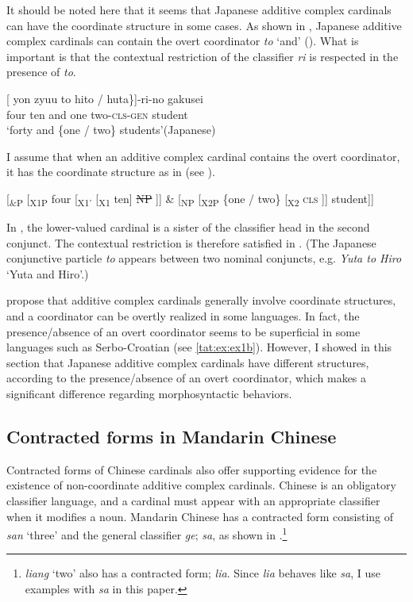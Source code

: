 \documentclass[output=paper]{langscibook}
\begin{document}
It should be noted here that it seems that Japanese additive complex cardinals can have the coordinate structure in some cases. As shown in , Japanese additive complex cardinals can contain the overt coordinator \textit{to} `and' (\citet{Hiraiwa2016ms}). What is important is that the contextual restriction of the classifier \textit{ri} is respected in the presence of \textit{to}. 

\ea\label{tat:ex:jap.additive.and}
\gll \textnormal{[} yon zyuu to \minsp{\{} hito / huta\textnormal{\}]}-ri-no gakusei\\  
      {} four ten and {} one {} two-\textsc{cls-gen} student\\ 
\glt `forty and \{one / two\} students'\hfill(Japanese)
\z

\noindent I assume that when an additive complex cardinal contains the overt coordinator, it has the coordinate structure as in  (see ).

\ea\label{tat:ex:jap.coord.st} 
{[}\textsubscript{\&P} [\textsubscript{X1P} four [\textsubscript{X1'} [\textsubscript{X1} ten] \sout{NP} ]] \& [\textsubscript{NP} [\textsubscript{X2P} \{one / two\} [\textsubscript{X2} \textsc{cls} ]] student]]
\z

\noindent In , the lower-valued cardinal is a sister of the classifier head in the second conjunct. The contextual restriction is therefore satisfied in . (The Japanese conjunctive particle \textit{to} appears between two nominal conjuncts, e.g. \textit{Yuta to Hiro} `Yuta and Hiro'.)

\citet{IoninMatushansky2018} propose that additive complex cardinals generally involve coordinate structures, and a coordinator can be overtly realized in some languages. In fact, the presence/absence of an overt coordinator seems to be superficial in some languages such as Serbo-Croatian (see \ref{tat:ex:ex1b}). However, I showed in this section that Japanese additive complex cardinals have different structures, according to the presence/absence of an overt coordinator, which makes a significant difference regarding morphosyntactic behaviors.

\subsection{Contracted forms in Mandarin Chinese}\label{tat:sec:add.ma}
Contracted forms of Chinese cardinals also offer supporting evidence for the existence of non-coordinate additive complex cardinals. Chinese is an obligatory classifier language, and a cardinal must appear with an appropriate classifier when it modifies a noun. Mandarin Chinese has a contracted form consisting of \textit{san} `three' and the general classifier \textit{ge}; \textit{sa}, as shown in .\footnote{\textit{liang} `two' also has a contracted form; \textit{lia}. Since \textit{lia} behaves like \textit{sa}, I use examples with \textit{sa} in this paper.} 
\end{document}
